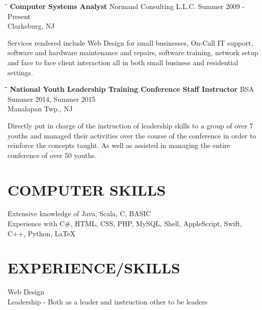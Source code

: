 \documentclass{res}
\begin{document}
\begin{resume}
   \begin{tabbing}
   \hspace{2.3in}\= \hspace{2.6in}\= \kill %
   {\bf Computer Systems Analyst}  \>Normand Consulting L.L.C. \> Summer 2009 - Present\\
                          \>Clarksburg, NJ
   \end{tabbing}\vspace{-20pt}            %
    Services rendered include Web Design for small businesses, On-Call IT support, software and hardware maintenance and repairs, software training, network setup and face to face client interaction all in both
    small business and residential settings.
    \vspace{-0.2in}
    \begin{tabbing}
   \hspace{2.3in}\= \hspace{2.2in}\= \hspace{.4in}\= \kill %
   {\bf National Youth Leadership Training Conference Staff Instructor}  \> \>BSA \> Summer 2014, Summer 2015\\
                          \>Manalapan Twp., NJ
   \end{tabbing}\vspace{-20pt}            %
    Directly put in charge of the instruction of leadership skills to a group of over 7 youths and managed their activities over the course of the conference in order to reinforce the concepts taught. As well as assisted in managing the entire conference of over 50 youths.
\vspace{-0.2in}
\section{COMPUTER SKILLS}          
    Extensive knowledge of Java, Scala, C, BASIC  \\ 
    Experience with C\#, HTML, CSS, PHP, MySQL, Shell, AppleScript, Swift, C++, Python, \LaTeX
\vspace{-0.2in}
\section{EXPERIENCE/SKILLS}
    Web Design \\
    Leadership - Both as a leader and instruction other to be leaders
\vspace{-0.2in}

\end{resume}
\end{document}
